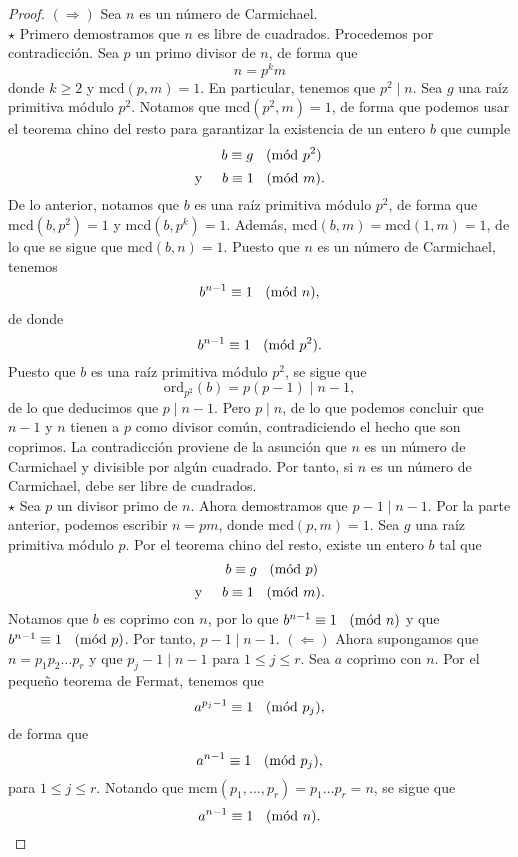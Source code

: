 \documentclass{article}
\theoremstyle{definition}
\newcommand{\Mod}[1]{\ \hspace{0.2cm} (\mathrm{m\acute{o}d}\ #1)}
\begin{document}
\begin{proof}
$(\Rightarrow)$	 Sea $n$ es un número de Carmichael. \\

$\star$ Primero demostramos  que $n$ es libre de cuadrados. Procedemos por contradicción. 
Sea $p$ un primo divisor de $n$, de forma que
$$ n = p^{k} m $$
donde $k\geq 2$ y $\text{mcd}(p, m) = 1$. En particular, tenemos que $p^{2} \mid n.$ Sea $g$ una raíz primitiva módulo $p^2$. Notamos que $\text{mcd}(p^2, m) = 1$, de forma que podemos usar el teorema chino del resto para garantizar la existencia de un entero $b$ que cumple
$$\hspace{0.6cm} b \equiv g \Mod{p^2} $$
$$\text{y} \hspace{0.5cm} b \equiv 1 \Mod{m} .$$
De lo anterior, notamos que $b$ es una raíz primitiva módulo $p^2$, de forma que $\text{mcd}(b, p^2) = 1$ y $\text{mcd}(b, p^k) = 1$. Además, $\text{mcd}(b, m) = \text{mcd}(1, m) = 1$, de lo que se sigue que $\text{mcd}(b, n) = 1.$ Puesto que $n$ es un número de Carmichael, tenemos
$$ b^{n-1} \equiv 1 \Mod{n}, $$
de donde
 $$ b^{n-1} \equiv 1 \Mod{p ^2}. $$
 Puesto que $b$ es una raíz primitiva módulo $p^2$, se sigue que $$ \text{ord}_{p^2}(b) =  p(p - 1) \mid n - 1, $$
 de lo que deducimos que $p \mid n -1$. Pero $p \mid n$, de lo que podemos concluir que $n - 1$ y $n$ tienen a $p$ como divisor común, contradiciendo el hecho que son coprimos. La contradicción proviene de la asunción que $n$ es un número de Carmichael y divisible por algún cuadrado. Por tanto, si $n$ es un número de Carmichael, debe ser libre de cuadrados. \\
 
 $\star$ Sea $p$ un divisor primo de $n$.  Ahora demostramos que $p-1 \mid n-1$. Por la parte anterior, podemos escribir $ n = pm $, donde $\text{mcd}(p, m) = 1.$ Sea $g$ una raíz primitiva módulo $p$. Por el teorema chino del resto, existe un entero $b$ tal que
 $$\hspace{0.6cm} b \equiv g \Mod{p} $$
 $$\text{y} \hspace{0.5cm} b \equiv 1 \Mod{m} .$$
 Notamos que $b$ es coprimo con $n$, por lo que $b^{n-1} \equiv 1 \Mod{n}$ y que  $b^{n-1}\equiv 1 \Mod{p}$. Por tanto, $p  - 1 \mid n - 1.$ 
 \newpage
 $(\Leftarrow)$ Ahora supongamos que $n = p_{1} p_{2} \ldots p_{r}$ y que $p_{j} - 1 \mid n  - 1$ para $1 \leq j \leq r.$ Sea $a$ coprimo con $n$. Por el pequeño teorema de Fermat, tenemos que 
 $$ a^{p_{j} - 1} \equiv 1 \Mod{p_{j}}, $$
de forma que
 $$ a^{n - 1} \equiv 1 \Mod{p_{j}}, $$
 para $1 \leq j \leq r.$ Notando que $\text{mcm}(p_{1}, \ldots, p_{r}) = p_{1} \ldots p_{r} =  n$, se sigue que
 $$ a^{n-1} \equiv 1 \Mod{n}. $$
\end{proof}
\end{document}
